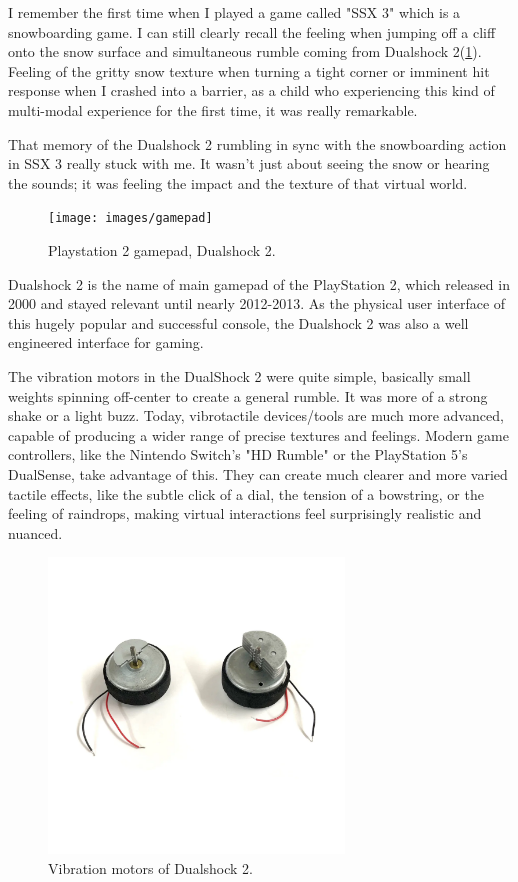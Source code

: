     I remember the first time when I played a game called "SSX 3" which is a snowboarding game. I can still clearly recall the feeling when jumping off a cliff onto the snow surface and simultaneous rumble coming from Dualshock 2(\ref{fig:DS2}). Feeling of the gritty snow texture when turning a tight corner or imminent hit response when I crashed into a barrier, as a child who experiencing this kind of multi-modal experience for the first time, it was really remarkable.\par

    That memory of the Dualshock 2 rumbling in sync with the snowboarding action in SSX 3 really stuck with me. It wasn't just about seeing the snow or hearing the sounds; it was feeling the impact and the texture of that virtual world.

    \begin{figure}[H]
    \centering
    \texttt{[image: images/gamepad]}
    \caption{Playstation 2 gamepad, Dualshock 2.}
    \label{fig:DS2}
    \end{figure}

    Dualshock 2 is the name of main gamepad of the PlayStation 2, which released in 2000 and stayed relevant until nearly 2012-2013. As the physical user interface of this hugely popular and successful console, the Dualshock 2 was also a well engineered interface for gaming.\par

    The vibration motors in the DualShock 2 were quite simple, basically small weights spinning off-center to create a general rumble. It was more of a strong shake or a light buzz\cite{PlayStation_Blogpost}. Today, vibrotactile devices/tools are much more advanced, capable of producing a wider range of precise textures and feelings. Modern game controllers, like the Nintendo Switch's "HD Rumble" or the PlayStation 5's DualSense, take advantage of this. They can create much clearer and more varied tactile effects, like the subtle click of a dial, the tension of a bowstring, or the feeling of raindrops, making virtual interactions feel surprisingly realistic and nuanced.

    \begin{figure}[H]
    \centering
    \includegraphics[width=0.7\textwidth]{images/vibration_motors_ds2}
    \caption{Vibration motors of Dualshock 2.}
    \label{fig:Vib_Motors}
    \end{figure}


